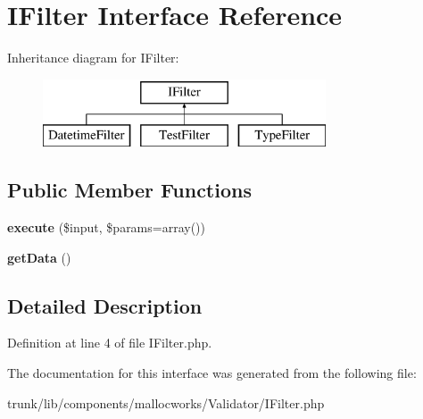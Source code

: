 \hypertarget{interface_utopia_1_1_components_1_1_filter_1_1_i_filter}{
\section{IFilter Interface Reference}
\label{interface_utopia_1_1_components_1_1_filter_1_1_i_filter}
}
Inheritance diagram for IFilter:\begin{figure}[H]
\begin{center}
\leavevmode
\includegraphics[height=2.000000cm]{interface_utopia_1_1_components_1_1_filter_1_1_i_filter}
\end{center}
\end{figure}
\subsection*{Public Member Functions}
\begin{DoxyCompactItemize}
\item 
\hypertarget{interface_utopia_1_1_components_1_1_filter_1_1_i_filter_ad90dcfe8ce8e387875a2d991f35ca839}{
{\bfseries execute} (\$input, \$params=array())}
\label{interface_utopia_1_1_components_1_1_filter_1_1_i_filter_ad90dcfe8ce8e387875a2d991f35ca839}

\item 
\hypertarget{interface_utopia_1_1_components_1_1_filter_1_1_i_filter_a81a67162a6288d78fc4c55283325f0b4}{
{\bfseries getData} ()}
\label{interface_utopia_1_1_components_1_1_filter_1_1_i_filter_a81a67162a6288d78fc4c55283325f0b4}

\end{DoxyCompactItemize}


\subsection{Detailed Description}


Definition at line 4 of file IFilter.php.



The documentation for this interface was generated from the following file:\begin{DoxyCompactItemize}
\item 
trunk/lib/components/mallocworks/Validator/IFilter.php\end{DoxyCompactItemize}
